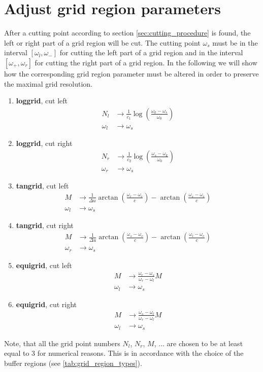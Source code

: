\section{Adjust grid region parameters}\label{sec:app_cutting_gr}
After a cutting point according to section \ref{sec:cutting_procedure} is found, the left or right part of a grid region will be cut. The cutting point $\omega_s$ must be in the interval $[\omega_l, \omega_-]$ for cutting the left part of a grid region and in the interval $[\omega_+, \omega_r]$ for cutting the right part of a grid region. In the following we will show how the corresponding grid region parameter must be altered in order to preserve the maximal grid resolution. 
\begin{enumerate}
	\item {\bf loggrid}, cut left
	\begin{align*}
		N_l&\to\frac{1}{c_1} \log\left(\frac{\omega_k -\omega_s}{\omega_0}\right) \\
		\omega_l&\to\omega_s
	\end{align*}
	\item {\bf loggrid}, cut right
	\begin{align*}
		N_r&\to\frac{1}{c_2} \log\left(\frac{\omega_s -\omega_k}{\omega_0}\right) \\
		\omega_r&\to\omega_s
	\end{align*}
	\item {\bf tangrid}, cut left
	\begin{align*}
                 M&\to\frac{1}{\Delta u} \arctan \left( \frac{\omega_r-\omega_c}{c} \right)-\arctan \left( \frac{\omega_s-\omega_c}{c} \right)\\
		\omega_l&\to\omega_s
	\end{align*}
	\item {\bf tangrid}, cut right
	\begin{align*}
                 M&\to\frac{1}{\Delta u} \arctan \left( \frac{\omega_s-\omega_c}{c} \right)-\arctan \left( \frac{\omega_l-\omega_c}{c} \right)\\
		\omega_r&\to\omega_s
	\end{align*}
	\item {\bf equigrid}, cut left
	\begin{align*}
                 M&\to\frac{\omega_r-\omega_s}{\omega_r-\omega_l} M\\
		\omega_l&\to\omega_s
	\end{align*}
	\item {\bf equigrid}, cut right
	\begin{align*}
                 M&\to\frac{\omega_s-\omega_l}{\omega_r-\omega_l} M\\
		\omega_l&\to\omega_s
	\end{align*}
\end{enumerate}
Note, that all the grid point numbers $N_l$, $N_r$, $M$, $\dots$ are chosen to be at least equal to $3$ for numerical reasons. This is in accordance with the choice of the buffer regions (see \ref{tab:grid_region_types}).









